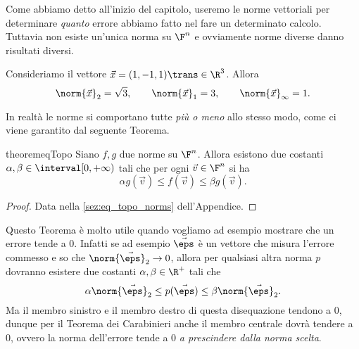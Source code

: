 Come abbiamo detto all'inizio del capitolo, useremo le norme vettoriali per determinare \emph{quanto} errore abbiamo fatto nel fare un determinato calcolo. Tuttavia non esiste un'unica norma su $\F^n$ e ovviamente norme diverse danno risultati diversi.

\begin{example}
    Consideriamo il vettore $\vec x = (1, -1, 1)\trans \in \R^3$. Allora \[
        \norm{\vec x}_2 = \sqrt 3, \qquad \norm{\vec x}_1 = 3, \qquad \norm{\vec x}_\infty = 1.
    \]
\end{example}

In realtà le norme si comportano tutte \emph{più o meno} allo stesso modo, come ci viene garantito dal seguente Teorema.
\begin{restatable}{theorem}{eqTopo}
    \label{th:eq_topo}
    Siano $f, g$ due norme su $\F^n$. Allora esistono due costanti $\alpha, \beta \in \interval[{0, +\infty})$ tali che per ogni $\vec v \in \F^n$ si ha  \[
        \alpha g(\vec v) \leq f(\vec v) \leq \beta g(\vec v).
    \]
\end{restatable}
\begin{proof}
    Data nella \autoref{sez:eq_topo_norms} dell'Appendice.
\end{proof}

Questo Teorema è molto utile quando vogliamo ad esempio mostrare che un errore tende a $0$. Infatti se ad esempio $\vec \eps$ è un vettore che misura l'errore commesso e so che $\norm{\vec \eps}_2 \to 0$, allora per qualsiasi altra norma $p$ dovranno esistere due costanti $\alpha, \beta \in \R^+$ tali che \[
    \alpha\norm{\vec \eps}_2 \leq p(\vec \eps) \leq \beta\norm{\vec \eps}_2.
\] Ma il membro sinistro e il membro destro di questa disequazione tendono a $0$, dunque per il Teorema dei Carabinieri anche il membro centrale dovrà tendere a $0$, ovvero la norma dell'errore tende a $0$ \emph{a prescindere dalla norma scelta}.
